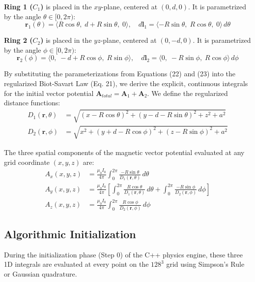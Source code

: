 \documentclass[11pt, a4paper]{article}
\begin{document}
\textbf{Ring 1 ($C_1$)} is placed in the $xy$-plane, centered at $(0, d, 0)$. It is parametrized by the angle $\theta \in [0, 2\pi)$:
\begin{equation}
    \mathbf{r}_1(\theta) = \langle R\cos\theta, \; d + R\sin\theta, \; 0 \rangle, \quad d\mathbf{l}_1 = \langle -R\sin\theta, \; R\cos\theta, \; 0 \rangle \, d\theta
\end{equation}

\textbf{Ring 2 ($C_2$)} is placed in the $yz$-plane, centered at $(0, -d, 0)$. It is parametrized by the angle $\phi \in [0, 2\pi)$:
\begin{equation}
    \mathbf{r}_2(\phi) = \langle 0, \; -d + R\cos\phi, \; R\sin\phi \rangle, \quad d\mathbf{l}_2 = \langle 0, \; -R\sin\phi, \; R\cos\phi \rangle \, d\phi
\end{equation}

By substituting the parameterizations from Equations (22) and (23) into the regularized Biot-Savart Law (Eq. 21), we derive the explicit, continuous integrals for the initial vector potential $\mathbf{A}_{total} = \mathbf{A}_1 + \mathbf{A}_2$. We define the regularized distance functions:
\begin{align}
    D_1(\mathbf{r}, \theta) &= \sqrt{(x - R\cos\theta)^2 + (y - d - R\sin\theta)^2 + z^2 + a^2} \\
    D_2(\mathbf{r}, \phi)   &= \sqrt{x^2 + (y + d - R\cos\phi)^2 + (z - R\sin\phi)^2 + a^2}
\end{align}

The three spatial components of the magnetic vector potential evaluated at any grid coordinate $(x,y,z)$ are:
\begin{align}
    A_x(x,y,z) &= \frac{\mu_0 I_0}{4\pi} \int_0^{2\pi} \frac{-R\sin\theta}{D_1(\mathbf{r}, \theta)} \, d\theta \\
    A_y(x,y,z) &= \frac{\mu_0 I_0}{4\pi} \left[ \int_0^{2\pi} \frac{R\cos\theta}{D_1(\mathbf{r}, \theta)} \, d\theta + \int_0^{2\pi} \frac{-R\sin\phi}{D_2(\mathbf{r}, \phi)} \, d\phi \right] \\
    A_z(x,y,z) &= \frac{\mu_0 I_0}{4\pi} \int_0^{2\pi} \frac{R\cos\phi}{D_2(\mathbf{r}, \phi)} \, d\phi
\end{align}

\subsection{Algorithmic Initialization}
During the initialization phase (Step 0) of the C++ physics engine, these three 1D integrals are evaluated at every point on the $128^3$ grid using Simpson's Rule or Gaussian quadrature. 
\end{document}
